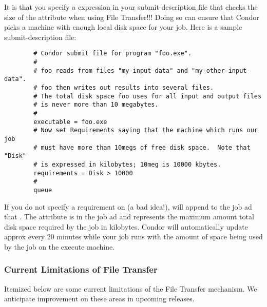 It is  that you specify a 
expression in your submit-description file that checks the size of the
 attribute when using File Transfer!!!  Doing so can ensure
that Condor picks a machine with enough local disk space for your job.
Here is a sample submit-description file:

\begin{verbatim}
        # Condor submit file for program "foo.exe".
        #
        # foo reads from files "my-input-data" and "my-other-input-data".
        # foo then writes out results into several files.
        # The total disk space foo uses for all input and output files
        # is never more than 10 megabytes.
        #
        executable = foo.exe
        # Now set Requirements saying that the machine which runs our job
        # must have more than 10megs of free disk space.  Note that "Disk"
        # is expressed in kilobytes; 10meg is 10000 kbytes.
        requirements = Disk > 10000
        # 
        queue
\end{verbatim}

If you do not specify a requirement on  (a bad idea!),
 will append to the job ad  that
.  The  attribute is in the
job ad and represents the maximum amount total disk space required by the
job in kilobytes.  Condor will automatically update 
approx every 20 minutes while your job runs with the amount of space being
used by the job on the execute machine.  

\subsubsection{Current Limitations of File Transfer}

Itemized below are some current limitations of the File Transfer mechanism.  We
anticipate improvement on these areas in upcoming releases.

